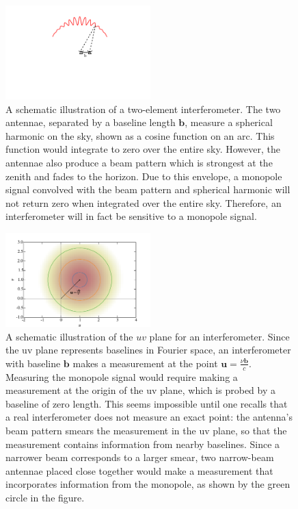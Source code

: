 \documentclass[twolcolumn,apj,iop,numberedappendix]{emulateapj}
\def\b{\mathbf{b}}
\begin{document}
\begin{figure}[h]
	\centering
	\includegraphics[width=0.50\textwidth]{figures/beam_pattern_cartoon.pdf}
	\caption{A schematic illustration of a two-element interferometer. The two antennae, separated by a baseline length $\b$, measure a spherical harmonic on the sky, shown as a cosine function on an arc. This function would integrate to zero over the entire sky. However, the antennae also produce a beam pattern which is strongest at the zenith and fades to the horizon. Due to this envelope, a monopole signal convolved with the beam pattern and spherical harmonic will not return zero when integrated over the entire sky. Therefore, an interferometer will in fact be sensitive to a monopole signal.}
	\label{fig:beam_pattern_cartoon}
\end{figure}

\begin{figure}[h]
	\centering
	\includegraphics[width=0.50\textwidth]{figures/uv_cartoon.pdf}
	\caption{A schematic illustration of the $uv$ plane for an interferometer. Since the uv plane represents baselines in Fourier space, an interferometer with baseline $\b$ makes a measurement at the point $\mathbf{u} = \frac{\nu\b}{c}$. Measuring the monopole signal would require making a measurement at the origin of the uv plane, which is probed by a baseline of zero length. This seems impossible until one recalls that a real interferometer does not measure an exact point: the antenna's beam pattern smears the measurement in the uv plane, so that the measurement contains information from nearby baselines. Since a narrower beam corresponds to a larger smear, two narrow-beam antennae placed close together would make a measurement that incorporates information from the monopole, as shown by the green circle in the figure.}
	\label{fig:uv_cartoon}
\end{figure}
\end{document}
